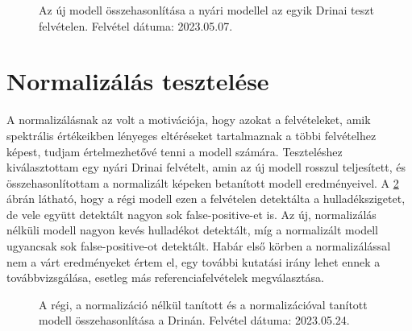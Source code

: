 \begin{figure}[H]
	\centering
	\hspace{5pt}
	\hspace{5pt}
	\caption{Az új modell összehasonlítása a nyári modellel az egyik Drinai teszt felvételen. Felvétel dátuma: 2023.05.07.}
	\label{fig:summer-vs-new}
\end{figure}

\section{Normalizálás tesztelése}
\label{ch:normalization-test} 

A normalizálásnak az volt a motivációja, hogy azokat a felvételeket, amik spektrális értékeikben lényeges eltéréseket tartalmaznak a többi felvételhez képest, tudjam értelmezhetővé tenni a modell számára. Teszteléshez kiválasztottam egy nyári Drinai felvételt, amin az új modell rosszul teljesített, és összehasonlítottam a normalizált képeken betanított modell eredményeivel. A \ref{fig:normal-vs-normalized-vs-old} ábrán látható, hogy a régi modell ezen a felvételen detektálta a hulladékszigetet, de vele együtt detektált nagyon sok false-positive-et is. Az új, normalizálás nélküli modell nagyon kevés hulladékot detektált, míg a normalizált modell ugyancsak sok false-positive-ot detektált. Habár első körben a normalizálással nem a várt eredményeket értem el, egy további kutatási irány lehet ennek a továbbvizsgálása, esetleg más referenciafelvételek megválasztása.

\begin{figure}[H]
	\centering
	\hspace{5pt}
	\hspace{5pt}
	\caption{A régi, a normalizáció nélkül tanított és a normalizációval tanított modell összehasonlítása a Drinán. Felvétel dátuma: 2023.05.24.}
	\label{fig:normal-vs-normalized-vs-old}
\end{figure}


